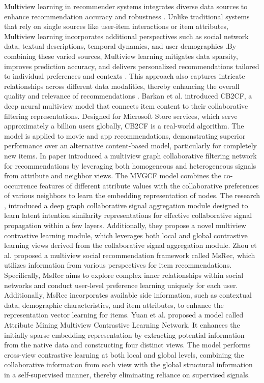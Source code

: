     Multiview learning in recommender systems integrates diverse data sources to enhance recommendation accuracy and robustness \cite{li2015deep}. Unlike traditional systems that rely on single sources like user-item interactions or item attributes,  Multiview learning incorporates additional perspectives such as social network data, textual descriptions, temporal dynamics, and user demographics  \cite{cheng2022modeling}.By combining these varied sources,  Multiview learning mitigates data sparsity, improves prediction accuracy, and delivers personalized recommendations tailored to individual preferences and contexts \cite{zhao2017multi, palomares2018multi}. This approach also captures intricate relationships across different data modalities, thereby enhancing the overall quality and relevance of recommendations  \cite{li2015deep}. Barkan et al. \cite{barkan2019cb2cf} introduced CB2CF, a deep neural multiview model that connects item content to their collaborative filtering  representations. Designed for Microsoft Store services, which serve approximately a billion users globally, CB2CF is a real-world algorithm. The model is applied to movie and app recommendations, demonstrating superior performance over an alternative content-based model, particularly for completely new items. In paper \cite{zheng2022multiview} introduced a multiview graph collaborative filtering network for recommendations by leveraging both homogeneous and heterogeneous signals from attribute and neighbor views. The MVGCF model combines the co-occurrence features of different attribute values with the collaborative preferences of various neighbors to learn the embedding representation of nodes. The research \cite{li2024md}, introduced a deep graph collaborative signal aggregation module designed to learn latent intention similarity representations for effective collaborative signal propagation within a few layers. Additionally, they propose a novel multiview contrastive learning module, which leverages both local and global contrastive learning views derived from the collaborative signal aggregation module.  Zhou et al. \cite{zhou2024multi} proposed a multiview social recommendation framework called MsRec, which utilizes information from various perspectives for item recommendations. Specifically, MsRec aims to explore complex inner relationships within social networks and conduct user-level preference learning uniquely for each user. Additionally, MsRec incorporates available side information, such as contextual data, demographic characteristics, and item attributes, to enhance the representation vector learning for items. Yuan et al. \cite{yuan2024attribute} proposed a model called Attribute Mining Multiview Contrastive Learning Network. It enhances the initially sparse embedding representation by extracting potential information from the native data and constructing four distinct views. The model performs cross-view contrastive learning at both local and global levels, combining the collaborative information from each view with the global structural information in a self-supervised manner, thereby eliminating reliance on supervised signals.
    
